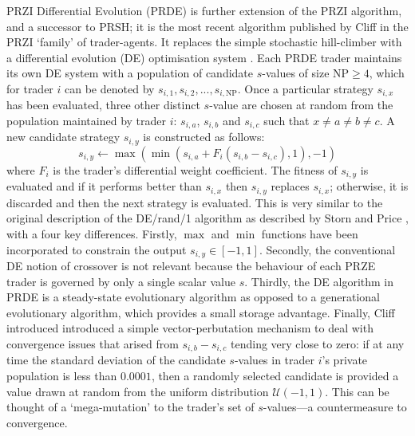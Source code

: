 \documentclass[conference]{IEEEtran}
\begin{document}
PRZI Differential Evolution (PRDE) \cite{PRDE} is further extension of the PRZI algorithm, and a successor to PRSH; it is the most recent algorithm published by Cliff in the PRZI `family' of trader-agents.
It replaces the simple stochastic hill-climber with a differential evolution (DE) optimisation system \cite{StornPrice}.
Each PRDE trader maintains its own DE system with a population of candidate $s$-values of size $\mathrm{NP}\ge4$, which for trader $i$ can be denoted by $s_{i,1},s_{i,2},...,s_{i,\mathrm{NP}}$.
Once a particular strategy $s_{i,x}$ has been evaluated, three other distinct $s$-value are chosen at random from the population maintained by trader $i$: $s_{i,a}$, $s_{i,b}$ and $s_{i,c}$ such that $x\ne a\ne b\ne c$.
A new candidate strategy $s_{i,y}$ is constructed as follows:
\[
s_{i,y}\leftarrow\max(\min(s_{i,a}+F_i(s_{i,b}-s_{i,c}),1), -1)
\]
where $F_i$ is the trader's differential weight coefficient.
The fitness of $s_{i,y}$ is evaluated and if it performs better than $s_{i,x}$ then $s_{i,y}$ replaces $s_{i,x}$; otherwise, it is discarded and then the next strategy is evaluated.
This is very similar to the original description of the DE/rand/1 algorithm as described by Storn and Price \cite{StornPrice}, with a four key differences.
Firstly, $\max$ and $\min$ functions have been incorporated to constrain the output $s_{i,y}\in[-1,1]$.
Secondly, the conventional DE notion of crossover is not relevant because the behaviour of each PRZE trader is governed by only a single scalar value $s$.
Thirdly, the DE algorithm in PRDE is a steady-state evolutionary algorithm as opposed to a generational evolutionary algorithm, which provides a small storage advantage.
Finally, Cliff introduced introduced a simple vector-perbutation mechanism to deal with convergence issues that arised from $s_{i,b}-s_{i,c}$ tending very close to zero: if at any time the standard deviation of the candidate $s$-values in trader $i$'s private population is less than $0.0001$, then a randomly selected candidate is provided a value drawn at random from the uniform distribution $\mathcal{U}(-1,1)$.
This can be thought of a `mega-mutation' to the trader's set of $s$-values---a countermeasure to convergence.
\end{document}
